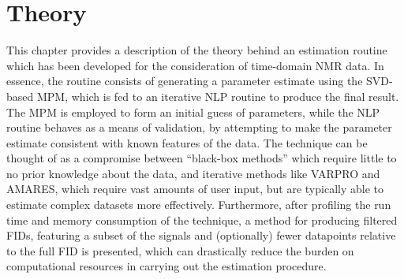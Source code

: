 \chapter{Theory}
\label{chap:theory}

This chapter provides a description of the theory behind an estimation
routine which has been developed for the consideration of time-domain \ac{NMR}
data.
In essence, the routine consists of generating a parameter estimate using the
\ac{SVD}-based \ac{MPM}, which is fed to an iterative \ac{NLP} routine to
produce the final result. The \ac{MPM} is employed to form an initial
guess of parameters, while the \ac{NLP} routine behaves as a means of validation,
by attempting to make the parameter estimate consistent with
known features of the data. The technique can be thought of as a compromise
between ``black-box methods''\cite{Poullet2008} which require little to no
prior knowledge about the data, and iterative methods like \ac{VARPRO} and
\ac{AMARES}, which require vast amounts of user input, but are typically
able to estimate complex datasets more effectively.
Furthermore, after profiling the run time and memory consumption of the
technique, a method for producing filtered \acp{FID}, featuring a subset of the
signals and (optionally) fewer datapoints relative to the full \ac{FID} is
presented, which can drastically reduce the burden on computational resources
in carrying out the estimation procedure.








